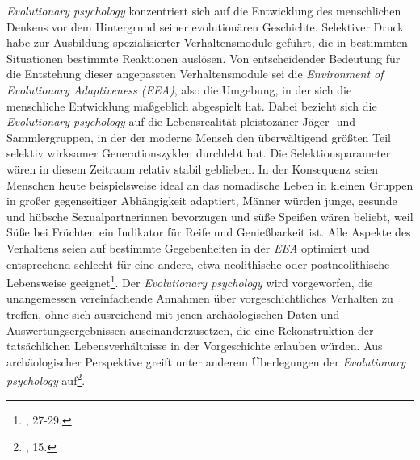 \documentclass[openany,twoside,twocolumn]{book}
\let\rmarkdownfootnote\footnote%
\def\footnote{\protect\rmarkdownfootnote}
\begin{document}
\emph{Evolutionary psychology} konzentriert sich auf die Entwicklung des
menschlichen Denkens vor dem Hintergrund seiner evolutionären
Geschichte. Selektiver Druck habe zur Ausbildung spezialisierter
Verhaltensmodule geführt, die in bestimmten Situationen bestimmte
Reaktionen auslösen. Von entscheidender Bedeutung für die Entstehung
dieser angepassten Verhaltensmodule sei die \emph{Environment of
Evolutionary Adaptiveness (EEA)}, also die Umgebung, in der sich die
menschliche Entwicklung maßgeblich abgespielt hat. Dabei bezieht sich
die \emph{Evolutionary psychology} auf die Lebensrealität pleistozäner
Jäger- und Sammlergruppen, in der der moderne Mensch den überwältigend
größten Teil selektiv wirksamer Generationszyklen durchlebt hat. Die
Selektionsparameter wären in diesem Zeitraum relativ stabil geblieben.
In der Konsequenz seien Menschen heute beispielsweise ideal an das
nomadische Leben in kleinen Gruppen in großer gegenseitiger Abhängigkeit
adaptiert, Männer würden junge, gesunde und hübsche Sexualpartnerinnen
bevorzugen und süße Speißen wären beliebt, weil Süße bei Früchten ein
Indikator für Reife und Genießbarkeit ist. Alle Aspekte des Verhaltens
seien auf bestimmte Gegebenheiten in der \emph{EEA} optimiert und
entsprechend schlecht für eine andere, etwa neolithische oder
postneolithische Lebensweise geeignet\footnote{\textcite{SmithThreestylesevolutionary2000},
  27-29.}. Der \emph{Evolutionary psychology} wird vorgeworfen, die
unangemessen vereinfachende Annahmen über vorgeschichtliches Verhalten
zu treffen, ohne sich ausreichend mit jenen archäologischen Daten und
Auswertungsergebnissen auseinanderzusetzen, die eine Rekonstruktion der
tatsächlichen Lebensverhältnisse in der Vorgeschichte erlauben würden.
Aus archäologischer Perspektive greift unter anderem
\textcite{Mithenprehistorymindsearch1996} Überlegungen der
\emph{Evolutionary psychology} auf\footnote{\textcite{ShennanGenesmemeshuman2002},
  15.}.
\end{document}
